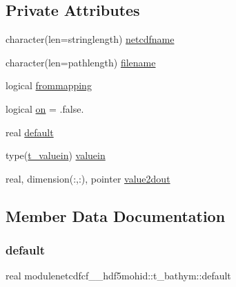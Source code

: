 \subsection*{Private Attributes}
\begin{DoxyCompactItemize}
\item 
character(len=stringlength) \mbox{\hyperlink{structmodulenetcdfcf__2__hdf5mohid_1_1t__bathym_a4979914ae0ba88dd899216027aba7635}{netcdfname}}
\item 
character(len=pathlength) \mbox{\hyperlink{structmodulenetcdfcf__2__hdf5mohid_1_1t__bathym_acc896300fe392c0182a25163f167659c}{filename}}
\item 
logical \mbox{\hyperlink{structmodulenetcdfcf__2__hdf5mohid_1_1t__bathym_aef70a107cd6cb600af590a011f7bb005}{frommapping}}
\item 
logical \mbox{\hyperlink{structmodulenetcdfcf__2__hdf5mohid_1_1t__bathym_ae3cdcecade3206dc4f1fcc9a2b2ea37d}{on}} = .false.
\item 
real \mbox{\hyperlink{structmodulenetcdfcf__2__hdf5mohid_1_1t__bathym_aff594b0df85faf07b5085a02c3512758}{default}}
\item 
type(\mbox{\hyperlink{structmodulenetcdfcf__2__hdf5mohid_1_1t__valuein}{t\+\_\+valuein}}) \mbox{\hyperlink{structmodulenetcdfcf__2__hdf5mohid_1_1t__bathym_a3de2f55c0c41641d590a32fa36edf023}{valuein}}
\item 
real, dimension(\+:,\+:), pointer \mbox{\hyperlink{structmodulenetcdfcf__2__hdf5mohid_1_1t__bathym_a017d752abed4c8622fe2631333435f5b}{value2dout}}
\end{DoxyCompactItemize}


\subsection{Member Data Documentation}
\mbox{\label{structmodulenetcdfcf__2__hdf5mohid_1_1t__bathym_aff594b0df85faf07b5085a02c3512758}} 
\subsubsection{\texorpdfstring{default}{default}}
{\footnotesize\ttfamily real modulenetcdfcf\+\_\+\_\+hdf5mohid\+::t\+\_\+bathym\+::default\hspace{0.3cm}{\ttfamily [private]}}

